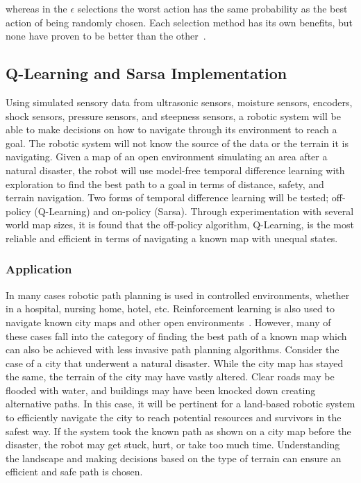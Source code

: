 \documentclass[12pt,american]{report}
\begin{document}
whereas in the \begin{math}\epsilon\end{math} selections the worst action has the same probability as the best action of being randomly chosen.  Each selection method has its own benefits, but none have proven to be better than the other~\cite{Eden}.


\subsection{Q-Learning and Sarsa Implementation}
Using simulated sensory data from ultrasonic sensors, moisture sensors, encoders, shock sensors, pressure sensors, and steepness sensors, a robotic system will be able to make decisions on how to navigate through its environment to reach a goal.  The robotic system will not know the source of the data or the terrain it is navigating.  Given a map of an open environment simulating an area after a natural disaster, the robot will use model-free temporal difference learning with exploration to find the best path to a goal in terms of distance, safety, and terrain navigation. Two forms of temporal difference learning will be tested; off-policy (Q-Learning) and on-policy (Sarsa). Through experimentation with several world map sizes, it is found that the off-policy algorithm, Q-Learning, is the most reliable and efficient in terms of navigating a known map with unequal states.

\subsubsection{Application}
In many cases robotic path planning is used in controlled environments, whether in a hospital, nursing home, hotel, etc. Reinforcement learning is also used to navigate known city maps and other open environments~\cite{peng2015mobile}. However, many of these cases fall into the category of finding the best path of a known map which can also be achieved with less invasive path planning algorithms. Consider the case of a city that underwent a natural disaster.  While the city map has stayed the same, the terrain of the city may have vastly altered. Clear roads may be flooded with water, and buildings may have been knocked down creating alternative paths. In this case, it will be pertinent for a land-based robotic system to efficiently navigate the city to reach potential resources and survivors in the safest way.  If the system took the known path as shown on a city map before the disaster, the robot may get stuck, hurt, or take too much time.  Understanding the landscape and making decisions based on the type of terrain can ensure an efficient and safe path is chosen.
\end{document}
